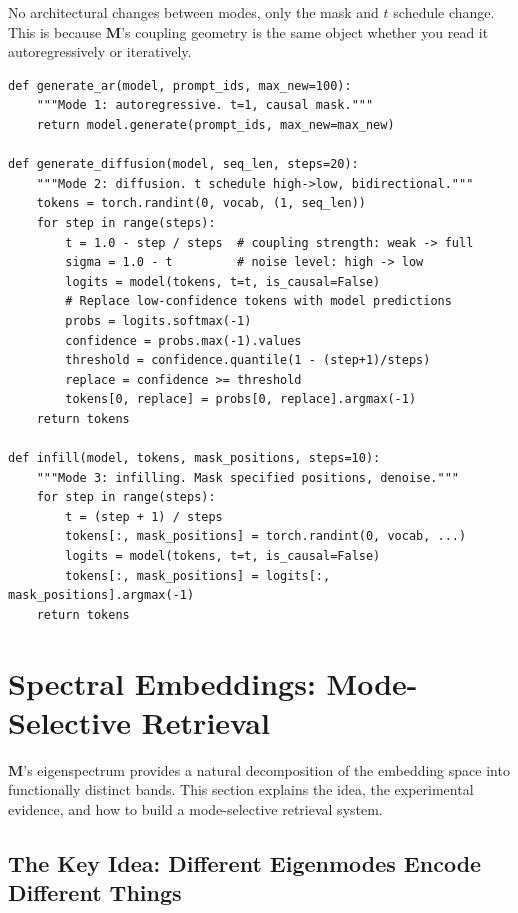 \documentclass[11pt, a4paper]{article}
\newcommand{\M}{\mathbf{M}}
\theoremstyle{remark}
\begin{document}
No architectural changes between modes, only the mask and $t$ schedule change.
This is because $\M$'s coupling geometry is the same object whether you read it autoregressively or iteratively.

\begin{lstlisting}[caption={Four modes from one model: only mask and $t$ change.}]
def generate_ar(model, prompt_ids, max_new=100):
    """Mode 1: autoregressive. t=1, causal mask."""
    return model.generate(prompt_ids, max_new=max_new)

def generate_diffusion(model, seq_len, steps=20):
    """Mode 2: diffusion. t schedule high->low, bidirectional."""
    tokens = torch.randint(0, vocab, (1, seq_len))
    for step in range(steps):
        t = 1.0 - step / steps  # coupling strength: weak -> full
        sigma = 1.0 - t         # noise level: high -> low
        logits = model(tokens, t=t, is_causal=False)
        # Replace low-confidence tokens with model predictions
        probs = logits.softmax(-1)
        confidence = probs.max(-1).values
        threshold = confidence.quantile(1 - (step+1)/steps)
        replace = confidence >= threshold
        tokens[0, replace] = probs[0, replace].argmax(-1)
    return tokens

def infill(model, tokens, mask_positions, steps=10):
    """Mode 3: infilling. Mask specified positions, denoise."""
    for step in range(steps):
        t = (step + 1) / steps
        tokens[:, mask_positions] = torch.randint(0, vocab, ...)
        logits = model(tokens, t=t, is_causal=False)
        tokens[:, mask_positions] = logits[:, mask_positions].argmax(-1)
    return tokens
\end{lstlisting}

\section{Spectral Embeddings: Mode-Selective Retrieval}
\label{sec:spectral-embed}

$\M$'s eigenspectrum provides a natural decomposition of the embedding space into functionally distinct bands.
This section explains the idea, the experimental evidence, and how to build a mode-selective retrieval system.

\subsection{The Key Idea: Different Eigenmodes Encode Different Things}
\end{document}
